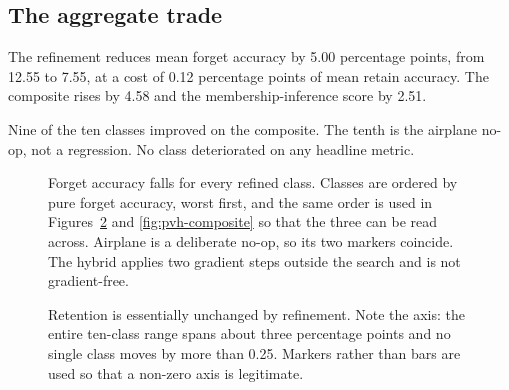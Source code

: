 \subsection{The aggregate trade}

\begin{table}[htbp]
  \centering
  \caption{Pure against hybrid MED-US, ten-class means. These are two different
  methods and this table compares them; it does not merge them.}
  \label{tab:pure-vs-hybrid}
\end{table}

The refinement reduces mean forget accuracy by 5.00 percentage points, from 12.55
to 7.55, at a cost of 0.12 percentage points of mean retain accuracy. The
composite rises by 4.58 and the membership-inference score by 2.51.

Nine of the ten classes improved on the composite. The tenth is the airplane
no-op, not a regression. No class deteriorated on any headline metric.

\begin{figure}[htbp]
  \centering
  \caption{Forget accuracy falls for every refined class. Classes are ordered by
  pure forget accuracy, worst first, and the same order is used in
  Figures~\ref{fig:pvh-accr} and \ref{fig:pvh-composite} so that the three can be
  read across. Airplane is a deliberate no-op, so its two markers coincide. The
  hybrid applies two gradient steps outside the search and is not gradient-free.}
  \label{fig:pvh-accf}
\end{figure}

\begin{figure}[htbp]
  \centering
  \caption{Retention is essentially unchanged by refinement. Note the axis: the
  entire ten-class range spans about three percentage points and no single class
  moves by more than 0.25. Markers rather than bars are used so that a non-zero
  axis is legitimate.}
  \label{fig:pvh-accr}
\end{figure}

